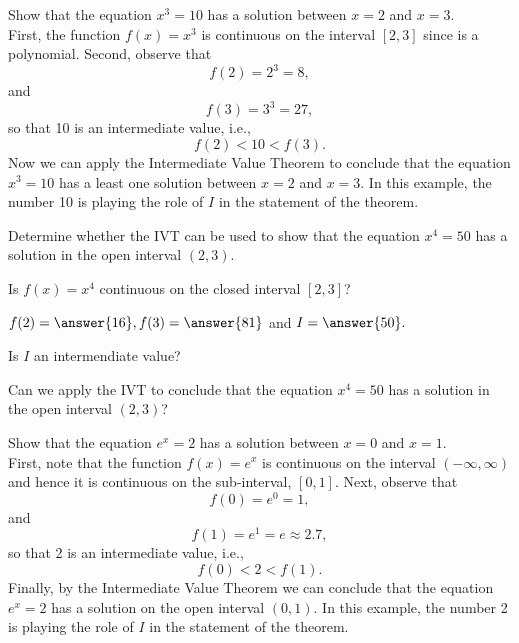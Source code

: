 \documentclass{ximera}
\begin{document}
\begin{example} %
Show that the equation $x^3 = 10$ has a solution between $x = 2$ and $x = 3$.\\
First, the function $f(x) = x^3$  is continuous on the interval $[2,3]$ 
since is a polynomial. 
Second, observe that 
\[
f(2) = 2^3 = 8,
\]
and 
\[
f(3) = 3^3 = 27,
\] 
so that 10 is an intermediate value, i.e.,
\[f(2) < 10 < f(3).\]
Now we can apply the Intermediate Value Theorem to
conclude that the equation $x^3 = 10$ has a least one solution between $x=2$ and $x=3$. 
In this example, the number 10 is playing the role of $I$ in the statement of the theorem.
\end{example}


\begin{problem}
Determine whether the IVT can be used to show that the equation $x^4 = 50$ has a solution in the open interval $(2,3)$.

Is $f(x) = x^4$ continuous on the closed interval $[2,3]$? 
\begin{center}
\begin{multipleChoice}
\end{multipleChoice}
\end{center}


$f(2) = \answer{16}, f(3) = \answer{81}$ and $I = \answer{50}.$

Is $I$ an intermendiate value? 
\begin{multipleChoice}
\end{multipleChoice}

Can we apply the IVT to conclude that the equation $x^4 = 50$ has a solution in the open interval $(2, 3)$?
\begin{multipleChoice}
\end{multipleChoice}
\end{problem}


\begin{example}
Show that the equation $e^x =2$ has a solution between $x = 0$ and $x = 1$.\\

First, note that the function $f(x) = e^x$ is continuous on the 
interval $(-\infty, \infty)$ and hence it is continuous on the sub-interval, $[0, 1]$. 
Next, observe that 
\[
f(0) = e^0 = 1,
\]
and 
\[
f(1) = e^1 = e \approx 2.7,
\]
 so that 2 is an intermediate value, i.e.,
\[f(0) < 2 < f(1).\]
Finally, by the Intermediate Value Theorem we can 
conclude that the equation $e^x = 2$ has a solution on the open interval $(0,1)$.
In this example, the number 2 is playing the role of $I$ in the statement of the theorem.
\end{example}
\end{document}
